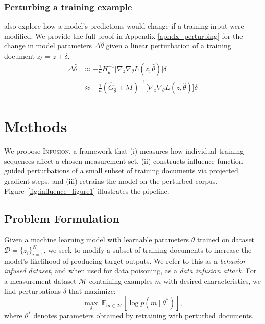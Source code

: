 \documentclass{article} %
\begin{document}
\subsubsection{Perturbing a training example}
\citet{koh2017understanding} also explore how a model's predictions would change if a training input were modified. We provide the full proof in Appendix \ref{apndx_perturbing} for the change in model parameters $\Delta \hat \theta$ given a linear perturbation of a training document $z_\delta = z + \delta $.
\begin{align}
\Delta\hat\theta &\approx -\frac{1}{n} H_{\hat{\theta}}^{-1} \big[ \nabla_z \nabla_\theta L(z, \hat\theta)\big]\delta \\
&\approx -\frac{1}{n} (\hat G_{\hat\theta} + \lambda I)^{-1} \big[ \nabla_z \nabla_\theta L(z, \hat\theta)\big]\delta
\label{eq:pert}
\end{align}


\section{Methods}
We propose \textsc{Infusion}, a framework that (i) measures how individual training sequences affect a chosen measurement set, (ii) constructs influence function-guided perturbations of a small subset of training documents via projected gradient steps, and (iii) retrains the model on the perturbed corpus. Figure~\ref{fig:influence_figure1} illustrates the pipeline.

\subsection{Problem Formulation}
Given a machine learning model with learnable parameters $\theta$ trained on dataset $\mathcal{D} = \{z_i\}_{i=1}^N$, we seek to modify a subset of training documents to increase the model's likelihood of producing target outputs. We refer to this as a \textit{behavior infused dataset}, and when used for data poisoning, as a \textit{data infusion attack}. For a measurement dataset $\mathcal{M}$ containing examples $m$ with desired characteristics, we find perturbations $\delta$ that maximize:
\begin{equation}
\max_{\delta}\; \mathbb{E}_{m \in \mathcal{M}} \left[ \log p(m \mid \theta^*) \right],
\end{equation}
where $\theta^*$ denotes parameters obtained by retraining with perturbed documents.
\end{document}
